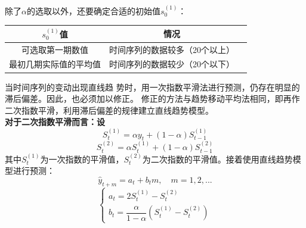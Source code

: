 \documentclass[11pt,a4paper]{article}
\begin{document}
\noindent 除了$\alpha$的选取以外，还要确定合适的初始值$s_0^{(1)}$：
\begin{table}[h]
	\centering
	\begin{tabular}{ccc}
		\hline
		$s_0^{(1)}$值& 情况 \\
		\hline
		可选取第一期数值 & 时间序列的数据较多（20个以上）\\
		最初几期实际值的平均值 & 时间序列的数据较少（20个以下）\\
		\hline
	\end{tabular}
\end{table}

\indent\setlength{\parindent}{2em}当时间序列的变动出现直线趋 势时，用一次指数平滑法进行预测，仍存在明显的滞后偏差。因此，也必须加以修正。 修正的方法与趋势移动平均法相同，即再作二次指数平滑，利用滞后偏差的规律建立直线趋势模型。\\
\indent\setlength{\parindent}{2em}\textbf{对于二次指数平滑而言：设}
\begin{equation*}
	S_t^{(1)}=\alpha y_t+(1-\alpha)S_{t-1}^{(1)}
\end{equation*}
\begin{equation*}
	S_t^{(2)}=\alpha S_t^{(1)}+(1-\alpha)S_{t-1}^{(2)}
\end{equation*}
其中$S_t^{(1)}$为一次指数的平滑值，$S_t^{(2)}$为二次指数的平滑值。接着使用直线趋势模型进行预测：\\
\begin{equation*}
\hat y_{t+m}=a_t+b_t m, \quad m=1,2,...
\end{equation*}
\begin{equation*}
\begin{cases}
a_t=2S_t^{(1)}-S_t^{(2)}\\
b_t=\dfrac{\alpha}{1-\alpha}(S_t^{(1)}-S_t^{(2)})
\end{cases}
\end{equation*}
\end{document}
